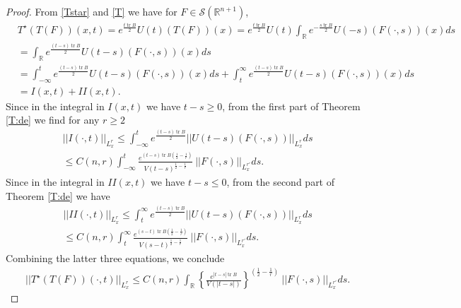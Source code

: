 \documentclass[11pt,letter]{amsart}
\def \R {\mathbb{R}}
\numberwithin{equation}{section}
\newcommand{\tr}{\operatorname{tr}}
\numberwithin{equation}{section}
\begin{document}
\begin{proof}

From \eqref{Tstar} and \eqref{T} we have for $F\in \mathscr S(\R^{n+1})$,
\begin{align*}
& T^\star(T(F))(x,t) = e^{\frac{t \tr B}2} U(t)(T(F))(x) = e^{\frac{t \tr B}2} U(t) \int_\R e^{-\frac{s \tr B}2} U(-s)(F(\cdot,s))(x) ds
\\
& =  \int_\R e^{\frac{(t-s) \tr B}2} U(t-s)(F(\cdot,s))(x) ds
\\
& = \int_{-\infty}^t e^{\frac{(t-s) \tr B}2} U(t-s)(F(\cdot,s))(x) ds + \int_t^\infty e^{\frac{(t-s) \tr B}2} U(t-s)(F(\cdot,s))(x) ds
\\
& = I(x,t) + II(x,t).
\end{align*}
Since in the integral in $I(x,t)$ we have $t-s\ge 0$, from the first part of Theorem \ref{T:de} we find for any $r\ge 2$
\begin{align*}
& ||I(\cdot,t)||_{L^r_x} \le \int_{-\infty}^t e^{\frac{(t-s) \tr B}2} ||U(t-s)(F(\cdot,s))||_{L^r_x} ds
\\
& \le C(n,r)\int_{-\infty}^t \frac{e^{(t-s) \tr B\left(\frac 12-\frac 1r\right)}}{V(t-s)^{\frac 12 - \frac 1{r}}}\ ||F(\cdot,s)||_{L^{r'}_x} ds. 
\end{align*}
Since in the integral in $II(x,t)$ we have $t-s\le 0$, from the second part of Theorem \ref{T:de} we have
\begin{align*}
& ||II(\cdot,t)||_{L^r_x} \le \int_t^\infty e^{\frac{(t-s) \tr B}2} ||U(t-s)(F(\cdot,s))||_{L^r_x} ds
\\
& \le C(n,r) \int_t^\infty \frac{e^{(s-t) \tr B\left(\frac 12-\frac 1r\right)}}{V(s-t)^{\frac 12 - \frac 1{r}}}\ ||F(\cdot,s)||_{L^{r'}_x} ds. 
\end{align*}
Combining the latter three equations, we conclude
\begin{align}\label{nice}
&  ||T^\star(T(F))(\cdot,t)||_{L^r_x} \le C(n,r) \int_\R \left\{\frac{e^{|t-s| \tr B}}{V(|t-s|)}\right\}^{\left(\frac 12-\frac 1r\right)}\ ||F(\cdot,s)||_{L^{r'}_x} ds. 
\end{align}


\end{proof}
\end{document}
